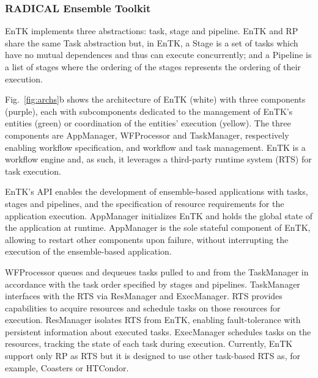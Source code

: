 \documentclass[preprint,12pt, a4paper]{elsarticle}
\begin{document}
\subsubsection{RADICAL Ensemble Toolkit}\label{sssec:arch_entk}

EnTK implements three abstractions: task, stage and pipeline. EnTK and RP share
the same Task abstraction but, in EnTK, a Stage is a set of tasks which have no
mutual dependences and thus can execute concurrently; and a Pipeline is a list
of stages where the ordering of the stages represents the ordering of their
execution.


Fig.~\ref{fig:archs}b shows the architecture of EnTK (white) with three
components (purple), each with subcomponents dedicated to the management of
EnTK's entities (green) or coordination of the entities' execution (yellow). The
three components are AppManager, WFProcessor and TaskManager, respectively
enabling workflow specification, and workflow and task management. EnTK is a
workflow engine and, as such, it leverages a third-party runtime system (RTS)
for task execution.


EnTK's API enables the development of ensemble-based applications with tasks,
stages and pipelines, and the specification of resource requirements for the
application execution. AppManager initializes EnTK and holds the global state
of the application at runtime. AppManager is the sole stateful component of
EnTK, allowing to restart other components upon failure, without interrupting
the execution of the ensemble-based application.

WFProcessor queues and dequeues tasks pulled to and from the TaskManager in
accordance with the task order specified by stages and pipelines. TaskManager
interfaces with the RTS via ResManager and ExecManager. RTS provides
capabilities to acquire resources and schedule tasks on those resources for
execution. ResManager isolates RTS from EnTK, enabling fault-tolerance with
persistent information about executed tasks. ExecManager schedules tasks on
the resources, tracking the state of each task during execution. Currently,
EnTK support only RP as RTS but it is designed to use other task-based RTS
as, for example, Coasters or HTCondor.
\end{document}
